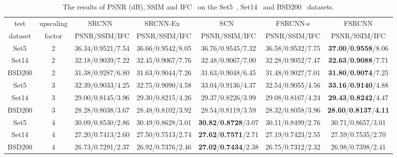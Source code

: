\documentclass[runningheads]{llncs}
\begin{document}
\begin{table*}[!h]\scriptsize
\caption{The results of PSNR (dB), SSIM and IFC~\cite{sheikh2005information} on the Set5~\cite{Sheikh2005}, Set14~\cite{Zeyde2012} and BSD200~\cite{martin2001database} datasets.}\label{result2}
\begin{center}
\begin{tabular}{|c|c|c|c|c|c|c|}
\hline
 test &  upscaling &  SRCNN~\cite{Dong2014} & SRCNN-Ex~\cite{Dong2015} & SCN~\cite{Wang2015} & FSRCNN-s & FSRCNN \\

 dataset & factor &  PSNR/SSIM/IFC& PSNR/SSIM/IFC &PSNR/SSIM/IFC & PSNR/SSIM/IFC & PSNR/SSIM/IFC\\

\hline\hline
Set5 & 2 &  36.34/0.9521/7.54 & 36.66/0.9542/8.05 & 36.76/0.9545/7.32 & 36.58/0.9532/7.75 & \textbf{37.00}/\textbf{0.9558}/8.06 \\
Set14 & 2 & 32.18/0.9039/7.22 & 32.45/0.9067/7.76 & 32.48/0.9067/7.00 & 32.28/0.9052/7.47 & \textbf{32.63}/\textbf{0.9088}/7.71\\
BSD200 & 2 &  31.38/0.9287/6.80 & 31.63/0.9044/7.26 & 31.63/0.9048/6.45 & 31.48/0.9027/7.01 & \textbf{31.80}/\textbf{0.9074}/7.25\\
\hline\hline

Set5 & 3 &  32.39/0.9033/4.25 & 32.75/0.9090/4.58 & 33.04/0.9136/4.37 & 32.54/0.9055/4.56 & \textbf{33.16}/\textbf{0.9140}/4.88\\
Set14 & 3 &  29.00/0.8145/3.96 & 29.30/0.8215/4.26 & 29.37/0.8226/3.99 & 29.08/0.8167/4.24 & \textbf{29.43}/\textbf{0.8242}/4.47 \\
BSD200 & 3 & 28.28/0.8038/3.67 & 28.48/0.8102/3.92 & 28.54/0.8119/3.59 & 28.32/0.8058/3.96 & \textbf{28.60}/\textbf{0.8137}/\textbf{4.11} \\
\hline\hline

Set5 & 4 &  30.09/0.8530/2.86 & 30.49/0.8628/3.01 & \textbf{30.82}/\textbf{0.8728}/3.07 & 30.11/0.8499/2.76 & 30.71/0.8657/3.01\\
Set14 & 4 &  27.20/0.7413/2.60 & 27.50/0.7513/2.74 & \textbf{27.62}/\textbf{0.7571}/2.71 & 27.19/0.7423/2.55 & 27.59/0.7535/2.70 \\
BSD200 & 4 & 26.73/0.7291/2.37 & 26.92/0.7376/2.46 & \textbf{27.02}/\textbf{0.7434}/2.38 & 26.75/0.7312/2.32 & 26.98/0.7398/2.41\\
\hline
\end{tabular}
\end{center}
\end{table*}
\end{document}
